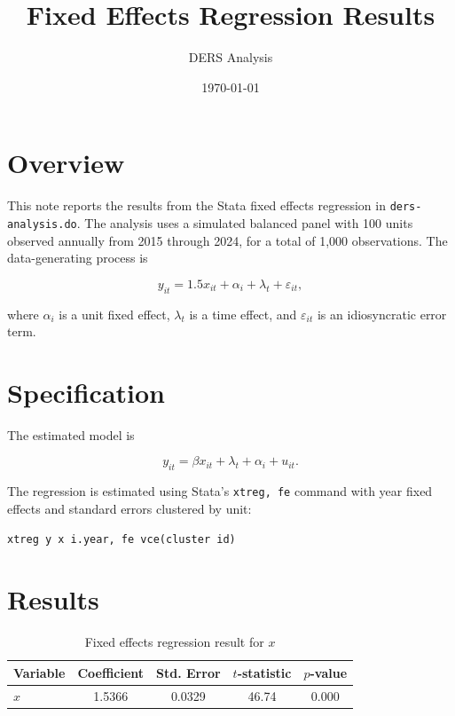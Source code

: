 \documentclass[12pt]{article}
\title{Fixed Effects Regression Results}
\author{DERS Analysis}
\date{\today}
\begin{document}
\maketitle

\section{Overview}

This note reports the results from the Stata fixed effects regression in
\texttt{ders- analysis.do}. The analysis uses a simulated balanced panel with
100 units observed annually from 2015 through 2024, for a total of 1,000
observations. The data-generating process is

\begin{equation}
    y_{it} = 1.5x_{it} + \alpha_i + \lambda_t + \varepsilon_{it},
\end{equation}

where $\alpha_i$ is a unit fixed effect, $\lambda_t$ is a time effect, and
$\varepsilon_{it}$ is an idiosyncratic error term.

\section{Specification}

The estimated model is

\begin{equation}
    y_{it} = \beta x_{it} + \lambda_t + \alpha_i + u_{it}.
\end{equation}

The regression is estimated using Stata's \texttt{xtreg, fe} command with year
fixed effects and standard errors clustered by unit:

\begin{verbatim}
xtreg y x i.year, fe vce(cluster id)
\end{verbatim}

\section{Results}

\begin{table}[h]
\centering
\begin{tabular}{lcccc}
\toprule
Variable & Coefficient & Std. Error & $t$-statistic & $p$-value \\
\midrule
$x$ & 1.5366 & 0.0329 & 46.74 & 0.000 \\
\bottomrule
\end{tabular}
\caption{Fixed effects regression result for $x$}
\end{table}
\end{document}
